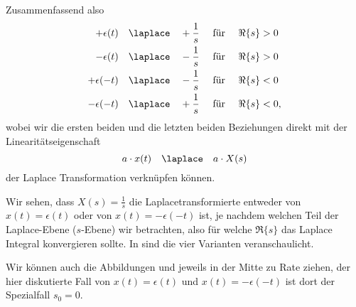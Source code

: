 \begin{Loesung}
%
Zusammenfassend also
\begin{align}
+\epsilon(t) \quad &\laplace \quad +\frac{1}{s} \quad\text{ für } \quad\Re\{s\} > 0\\
-\epsilon(t) \quad &\laplace \quad -\frac{1}{s} \quad\text{ für } \quad\Re\{s\} > 0\\
+\epsilon(-t) \quad &\laplace \quad -\frac{1}{s} \quad\text{ für }\quad \Re\{s\} < 0\\
-\epsilon(-t) \quad &\laplace \quad +\frac{1}{s} \quad\text{ für }\quad \Re\{s\} < 0,
\end{align}
wobei wir die ersten beiden und die letzten beiden Beziehungen
direkt mit der Linearitätseigenschaft
\begin{equation}
a \cdot x(t) \quad \laplace \quad a \cdot X(s)
\end{equation}
der Laplace Transformation
verknüpfen können.

Wir sehen, dass
$X(s)=\frac{1}{s}$ die Laplacetransformierte entweder von $x(t) = \epsilon(t)$
oder von $x(t)=-\epsilon(-t)$ ist, je nachdem welchen Teil der Laplace-Ebene ($s$-Ebene)
wir betrachten, also für welche $\Re\{s\}$ das Laplace Integral konvergieren sollte.
%
In  sind die vier Varianten veranschaulicht.

Wir können auch die Abbildungen  und
 jeweils in der Mitte zu Rate ziehen, der hier
diskutierte Fall von $x(t)=\epsilon(t)$ und $x(t)=-\epsilon(-t)$ ist dort der
Spezialfall $s_0=0$.
%
\end{Loesung}


